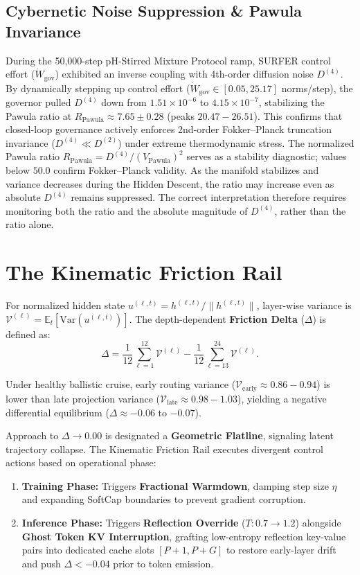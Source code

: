 \documentclass[11pt,twocolumn]{article}
\begin{document}
\subsection{Cybernetic Noise Suppression \& Pawula Invariance}
During the 50,000-step pH-Stirred Mixture Protocol ramp, SURFER control effort ($\dot{W}_{\mathrm{gov}}$) exhibited an inverse coupling with 4th-order diffusion noise $D^{(4)}$. By dynamically stepping up control effort ($\dot{W}_{\mathrm{gov}} \in [0.05, 25.17]$ norms/step), the governor pulled $D^{(4)}$ down from $1.51 \times 10^{-6}$ to $4.15 \times 10^{-7}$, stabilizing the Pawula ratio at $R_{\mathrm{Pawula}} \approx 7.65 \pm 0.28$ (peaks $20.47 - 26.51$). This confirms that closed-loop governance actively enforces 2nd-order Fokker--Planck truncation invariance ($D^{(4)} \ll D^{(2)}$) under extreme thermodynamic stress. The normalized Pawula ratio $R_{\mathrm{Pawula}} = D^{(4)}/(V_{\mathrm{Pawula}})^2$ serves as a stability diagnostic; values below $50.0$ confirm Fokker--Planck validity. As the manifold stabilizes and variance decreases during the Hidden Descent, the ratio may increase even as absolute $D^{(4)}$ remains suppressed. The correct interpretation therefore requires monitoring both the ratio and the absolute magnitude of $D^{(4)}$, rather than the ratio alone.

\section{The Kinematic Friction Rail}
For normalized hidden state $u^{(\ell,t)} = h^{(\ell,t)} / \|h^{(\ell,t)}\|$, layer-wise variance is $\mathcal{V}^{(\ell)} = \mathbb{E}_t [\text{Var}(u^{(\ell,t)})]$. The depth-dependent \textbf{Friction Delta} ($\Delta$) is defined as:
\begin{equation}
\Delta = \frac{1}{12}\sum_{\ell=1}^{12}\mathcal{V}^{(\ell)} - \frac{1}{12}\sum_{\ell=13}^{24}\mathcal{V}^{(\ell)}.
\end{equation}

Under healthy ballistic cruise, early routing variance ($\mathcal{V}_{\text{early}} \approx 0.86 - 0.94$) is lower than late projection variance ($\mathcal{V}_{\text{late}} \approx 0.98 - 1.03$), yielding a negative differential equilibrium ($\Delta \approx -0.06$ to $-0.07$).

Approach to $\Delta \to 0.00$ is designated a \textbf{Geometric Flatline}, signaling latent trajectory collapse. The Kinematic Friction Rail executes divergent control actions based on operational phase:
\begin{enumerate}
\item \textbf{Training Phase:} Triggers \textbf{Fractional Warmdown}, damping step size $\eta$ and expanding SoftCap boundaries to prevent gradient corruption.
\item \textbf{Inference Phase:} Triggers \textbf{Reflection Override} ($T: 0.7 \to 1.2$) alongside \textbf{Ghost Token KV Interruption}, grafting low-entropy reflection key-value pairs into dedicated cache slots $[P+1, P+G]$ to restore early-layer drift and push $\Delta < -0.04$ prior to token emission.
\end{enumerate}
\end{document}
